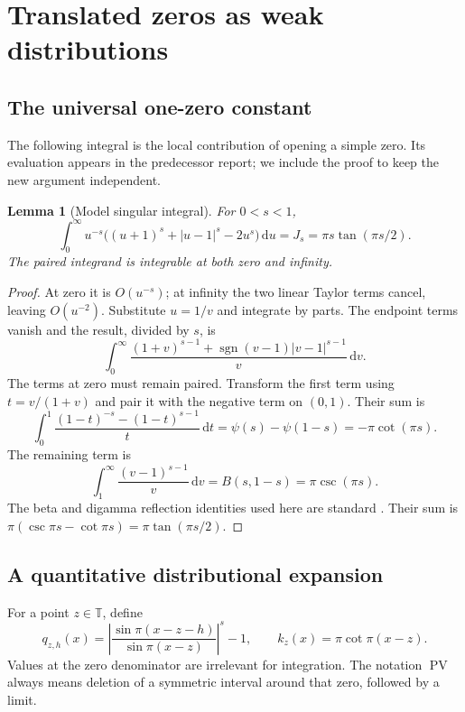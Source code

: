 \documentclass[11pt,a4paper]{article}
\numberwithin{equation}{section}
\newtheorem{lemma}[lemma]{Lemma}
\theoremstyle{definition}
\theoremstyle{remark}
\newcommand{\TT}{\mathbb T}
\newcommand{\dd}{\,\mathrm d}
\newcommand{\PV}{\operatorname{PV}}
\begin{document}
\section{Translated zeros as weak distributions}
\label{sec:distribution}

\subsection{The universal one-zero constant}
The following integral is the local contribution of opening a simple
zero. Its evaluation appears in the predecessor report; we include the
proof to keep the new argument independent.

\begin{lemma}[Model singular integral]
\label{lem:J}
For $0<s<1$,
\begin{equation}
 \int_0^\infty u^{-s}
       \bigl((u+1)^s+|u-1|^s-2u^s\bigr)\dd u
 =J_s=\pi s\tan(\pi s/2).
 \label{eq:J}
\end{equation}
The paired integrand is integrable at both zero and infinity.
\end{lemma}
\begin{proof}
At zero it is $O(u^{-s})$; at infinity the two linear Taylor terms
cancel, leaving $O(u^{-2})$. Substitute $u=1/v$ and integrate by parts.
The endpoint terms vanish and the result, divided by $s$, is
\begin{equation}
 \int_0^\infty
 \frac{(1+v)^{s-1}+\operatorname{sgn}(v-1)|v-1|^{s-1}}{v}\dd v.
 \label{eq:Jparts}
\end{equation}
The terms at zero must remain paired. Transform the first term using
$t=v/(1+v)$ and pair it with the negative term on $(0,1)$. Their sum is
\[
 \int_0^1\frac{(1-t)^{-s}-(1-t)^{s-1}}t\dd t
 =\psi(s)-\psi(1-s)=-\pi\cot(\pi s).
\]
The remaining term is
\[
 \int_1^\infty\frac{(v-1)^{s-1}}v\dd v
 =B(s,1-s)=\pi\csc(\pi s).
\]
The beta and digamma reflection identities used here are standard
\cite[\S5.5]{DLMF}. Their sum is
$\pi(\csc\pi s-\cot\pi s)=\pi\tan(\pi s/2)$.
\end{proof}

\subsection{A quantitative distributional expansion}
For a point $z\in\TT$, define
\[
 q_{z,h}(x)=\left|\frac{\sin\pi(x-z-h)}{\sin\pi(x-z)}\right|^s-1,
 \qquad k_z(x)=\pi\cot\pi(x-z).
\]
Values at the zero denominator are irrelevant for integration. The
notation $\PV$ always means deletion of a symmetric interval around
that zero, followed by a limit.
\end{document}
